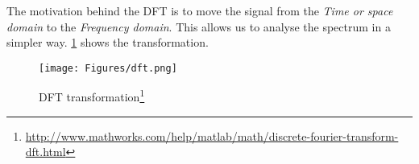 \noindent The motivation behind the DFT is to move the signal from the \textit{Time or space domain} to the \textit{Frequency domain}. This allows us to analyse the spectrum in a simpler way. \ref{fig:dft} shows the transformation.

\begin{figure}[!ht]
	\centering
	\texttt{[image: Figures/dft.png]}
	\caption{DFT transformation\footnote{\url{http://www.mathworks.com/help/matlab/math/discrete-fourier-transform-dft.html}}}
	\label{fig:dft}
\end{figure}
